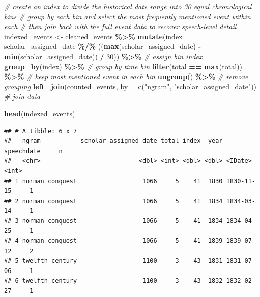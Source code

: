 \documentclass[
]{article}
\newenvironment{Shaded}{\begin{snugshade}}{\end{snugshade}}
\newcommand{\AttributeTok}[1]{\textcolor[rgb]{0.13,0.29,0.53}{#1}}
\newcommand{\CommentTok}[1]{\textcolor[rgb]{0.56,0.35,0.01}{\textit{#1}}}
\newcommand{\DecValTok}[1]{\textcolor[rgb]{0.00,0.00,0.81}{#1}}
\newcommand{\FunctionTok}[1]{\textcolor[rgb]{0.13,0.29,0.53}{\textbf{#1}}}
\newcommand{\NormalTok}[1]{#1}
\newcommand{\OtherTok}[1]{\textcolor[rgb]{0.56,0.35,0.01}{#1}}
\newcommand{\SpecialCharTok}[1]{\textcolor[rgb]{0.81,0.36,0.00}{\textbf{#1}}}
\newcommand{\StringTok}[1]{\textcolor[rgb]{0.31,0.60,0.02}{#1}}
\begin{document}
\begin{Shaded}
\begin{Highlighting}[]
\CommentTok{\# create an index to divide the historical date range into 30 equal chronological bins}
\CommentTok{\# group by each bin and select the most frequently mentioned event within each}
\CommentTok{\# then join back with the full event data to recover speech{-}level detail}
\NormalTok{indexed\_events }\OtherTok{\textless{}{-}}\NormalTok{ cleaned\_events }\SpecialCharTok{\%\textgreater{}\%}
  \FunctionTok{mutate}\NormalTok{(}\AttributeTok{index =}\NormalTok{ scholar\_assigned\_date }\SpecialCharTok{\%/\%} 
\NormalTok{           ((}\FunctionTok{max}\NormalTok{(scholar\_assigned\_date) }\SpecialCharTok{{-}} 
               \FunctionTok{min}\NormalTok{(scholar\_assigned\_date)) }\SpecialCharTok{/} \DecValTok{30}\NormalTok{)) }\SpecialCharTok{\%\textgreater{}\%} \CommentTok{\# assign bin index}
  \FunctionTok{group\_by}\NormalTok{(index) }\SpecialCharTok{\%\textgreater{}\%} \CommentTok{\# group by time bin}
  \FunctionTok{filter}\NormalTok{(total }\SpecialCharTok{==} \FunctionTok{max}\NormalTok{(total)) }\SpecialCharTok{\%\textgreater{}\%} \CommentTok{\# keep most mentioned event in each bin}
  \FunctionTok{ungroup}\NormalTok{() }\SpecialCharTok{\%\textgreater{}\%} \CommentTok{\# remove grouping}
  \FunctionTok{left\_join}\NormalTok{(counted\_events, }\AttributeTok{by =} \FunctionTok{c}\NormalTok{(}\StringTok{"ngram"}\NormalTok{, }\StringTok{"scholar\_assigned\_date"}\NormalTok{)) }\CommentTok{\# join data}

\FunctionTok{head}\NormalTok{(indexed\_events)}
\end{Highlighting}
\end{Shaded}

\begin{verbatim}
## # A tibble: 6 x 7
##   ngram           scholar_assigned_date total index  year speechdate     n
##   <chr>                           <dbl> <int> <dbl> <dbl> <IDate>    <int>
## 1 norman conquest                  1066     5    41  1830 1830-11-15     1
## 2 norman conquest                  1066     5    41  1834 1834-03-14     1
## 3 norman conquest                  1066     5    41  1834 1834-04-25     1
## 4 norman conquest                  1066     5    41  1839 1839-07-12     2
## 5 twelfth century                  1100     3    43  1831 1831-07-06     1
## 6 twelfth century                  1100     3    43  1832 1832-02-27     1
\end{verbatim}

\begin{Shaded}
\end{Shaded}
\end{document}
